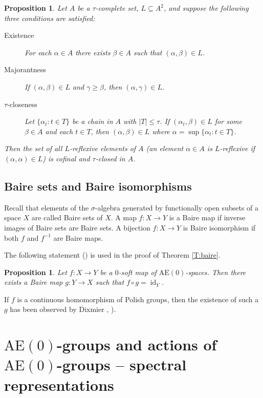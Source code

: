 \documentclass[12pt,draft]{amsart}
\theoremstyle{plain}
\newtheorem{pro}[thm]{Proposition}
\theoremstyle{definition}
\numberwithin{equation}{section}
\begin{document}
\begin{pro}\label{P:search}
Let  $A$  be a $\tau$-complete set, 
$L \subseteq A^2$, and suppose the following three
conditions are satisfied:
\begin{description}
\item[Existence] For each $\alpha \in A$ there exists
$\beta \in A$  such that  $(\alpha ,\beta ) \in L$.
\item[Majorantness] If  $(\alpha ,\beta ) \in L$  and
$\gamma \geq \beta$, then  $(\alpha ,\gamma ) \in L$.
\item[$\tau$-closeness] Let $\{ \alpha_{t} : t \in T \}$
be a chain in $A$ with $|T| \leq \tau$. If
$(\alpha_{t}, \beta ) \in L$ for some
$\beta \in A$ and each $t \in T$, then
$(\alpha ,\beta ) \in L$ where $\alpha =
\sup \{\alpha_{t} \colon t \in T \}$.
\end{description}
   Then the set of all  $L$-{\em reflexive} elements of 
$A$ (an element $\alpha \in A$ is $L$-reflexive if
$(\alpha ,\alpha ) \in L$)  is cofinal and $\tau$-closed in $A$.
\end{pro}


\subsection{Baire sets and Baire isomorphisms}\label{SS:bairesets}
Recall that elements of the $\sigma$-algebra generated
by functionally open subsets of a space $X$ are called Baire sets of $X$.
A map $f \colon X \to Y$ is a Baire map if inverse images of Baire
sets are Baire sets. A bijection $f \colon X \to Y$ is Baire
isomorphism if both $f$ and $f^{-1}$ are Baire maps.

The following statement (\cite[Proposition 2.5]{chi994}) is
used in the proof of Theorem \ref{T:baire}.

\begin{pro}\label{P:bb}
Let $f \colon X \to Y$ be a $0$-soft map of
$\text{AE}(0)$-spaces. Then there exists a Baire map
$g \colon Y \to X$ such that $f \circ g = \operatorname{id}_{Y}$.
\end{pro}

If $f$ is a continuous homomorphism of Polish groups, then
the existence of such a $g$ has been observed by Dixmier
\cite[Theorem 1.2.4]{bekech96}, \cite[Theorem 12.17]{kech95}).



\section{$\text{AE}(0)$-groups and actions of
$\text{AE}(0)$-groups -- spectral representations}\label{S:spectral}
\end{document}
